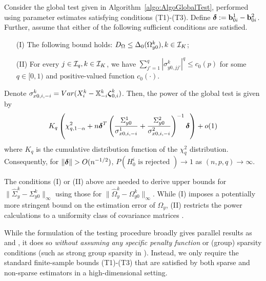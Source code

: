 \begin{theorem}\label{thm:PowerThm}
Consider the global test given in Algorithm~\ref{algo:AlgoGlobalTest}, performed using parameter estimates satisfying conditions (T1)-(T3). Define ${\boldsymbol{\delta}} := {\bf{b}}_{0 i}^1 - {\bf{b}}_{0 i}^2$. Further, assume that either of the following sufficient conditions are satisfied.

\begin{itemize}
\item[(I)] The following bound holds: $D_\Omega \leq \Delta_0 (\Omega_{y0}^k), k \in {\cal{I}}_K$;

\item[(II)] For every $j \in {\cal{I}}_q, k \in {\cal{I}}_K$, we have
$
\sum_{j' = 1}^q | \sigma_{y0,jj'}^k |^q \leq c_0 (p)
$ for some $q \in [0,1)$ and positive-valued function $c_0(\cdot)$.
\end{itemize}

Denote $\sigma_{x0,i,-i}^k = Var( X_i^k - {\mathbb{X}}_{-i}^k {\boldsymbol{\zeta}}_{0,i}^k)$. Then, the power of the global test is given by
%
$$
K_q \left( \chi^2_{q,1-\alpha} + n {\boldsymbol{\delta}}^T 
\left( \frac{ \Sigma_{y 0}^1}{\sigma_{x0, i,-i}^1} + \frac{\Sigma_{y 0}^2}{\sigma_{x0, i,-i}^2} \right)^{-1} {\boldsymbol{\delta}} \right) + o(1)
$$
%
where $K_q$ is the cumulative distribution function of the $\chi^2_q$ distribution. Consequently, for $\| {\boldsymbol{\delta}} \| > O(n^{-1/2})$, $P( H_0^i \text{ is rejected }) \rightarrow 1$ as $(n,p,q) \rightarrow \infty$.
\end{theorem}

The conditions (I) or (II) above are needed to derive upper bounds for $\| \widehat \Sigma_y^k - \Sigma_{y0}^k \|_\infty$ using those for $\| \widehat \Omega_y^k - \Omega_{y0}^k \|_\infty$. While (I) imposes a potentially more stringent bound on the estimation error of $\Omega_y$, (II) restricts the power calculations to a uniformity class of covariance matrices \citep{BickelLevina08,CaiLiuLuo12}.
%


\begin{Remark}
While the formulation of the testing procedure broadly gives parallel results as  \citet{ZhangZhang14} and \citet{MitraZhang16}, it does so \textit{without assuming any specific penalty function} or (group) sparsity conditions (such as strong group sparsity in \citet{MitraZhang16}). Instead, we only require the standard finite-sample bounds (T1)-(T3) that are satisfied by both sparse and non-sparse estimators in a high-dimensional setting.
\end{Remark}


